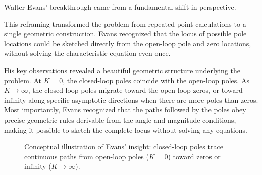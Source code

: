 Walter Evans' breakthrough came from a fundamental shift in perspective.

This reframing transformed the problem from repeated point calculations to a single geometric construction. Evans recognized that the locus of possible pole locations could be sketched directly from the open-loop pole and zero locations, without solving the characteristic equation even once.

His key observations revealed a beautiful geometric structure underlying the problem. At $K = 0$, the closed-loop poles coincide with the open-loop poles. As $K \to \infty$, the closed-loop poles migrate toward the open-loop zeros, or toward infinity along specific asymptotic directions when there are more poles than zeros. Most importantly, Evans recognized that the paths followed by the poles obey precise geometric rules derivable from the angle and magnitude conditions, making it possible to sketch the complete locus without solving any equations.

\begin{figure}[H]
\centering
{}
\caption{Conceptual illustration of Evans' insight: closed-loop poles trace continuous paths from open-loop poles ($K=0$) toward zeros or infinity ($K \to \infty$).}
\label{fig:evans_insight}
\end{figure}

